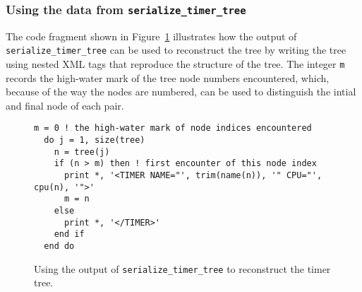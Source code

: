 \documentclass[11pt]{article}
\begin{document}
\subsubsection{Using the data from \texttt{serialize_timer_tree}}
The code fragment shown in Figure~\ref{fig2} illustrates how the output
of \texttt{serialize_timer_tree} can be used to reconstruct the tree by
writing the tree using nested XML tags that reproduce the structure of
the tree.  The integer \texttt{m} records the high-water mark of the tree
node numbers encountered, which, because of the way the nodes are numbered,
can be used to distinguish the intial and final node of each pair.
\begin{figure}[t]
\begin{Verbatim}[frame=single,framesep=5pt]
  m = 0 ! the high-water mark of node indices encountered
  do j = 1, size(tree)
    n = tree(j)
    if (n > m) then ! first encounter of this node index
      print *, '<TIMER NAME="', trim(name(n)), '" CPU="', cpu(n), '">'
      m = n
    else
      print *, '</TIMER>'
    end if
  end do
\end{Verbatim}
\caption{Using the output of \texttt{serialize_timer_tree} to reconstruct
  the timer tree.}%
  \label{fig2}
\end{figure}
\end{document}
